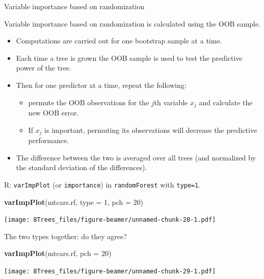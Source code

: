 \documentclass[10pt,ignorenonframetext,]{beamer}
\newenvironment{Shaded}{\begin{snugshade}}{\end{snugshade}}
\newcommand{\KeywordTok}[1]{\textcolor[rgb]{0.13,0.29,0.53}{\textbf{#1}}}
\newcommand{\DataTypeTok}[1]{\textcolor[rgb]{0.13,0.29,0.53}{#1}}
\newcommand{\DecValTok}[1]{\textcolor[rgb]{0.00,0.00,0.81}{#1}}
\newcommand{\NormalTok}[1]{#1}
\providecommand{\tightlist}{%
  \setlength{\itemsep}{0pt}\setlength{\parskip}{0pt}}
\begin{document}
\begin{frame}[fragile]

\begin{block}{Variable importance based on randomization}

Variable importance based on randomization is calculated using the OOB
sample.

\begin{itemize}
\tightlist
\item
  Computations are carried out for one bootstrap sample at a time.
\item
  Each time a tree is grown the OOB sample is used to test the
  predictive power of the tree.
\item
  Then for one predictor at a time, repeat the following:

  \begin{itemize}
  \tightlist
  \item
    permute the OOB observations for the \(j\)th variable \(x_j\) and
    calculate the new OOB error.
  \item
    If \(x_j\) is important, permuting its observations will decrease
    the predictive performance.
  \end{itemize}
\item
  The difference between the two is averaged over all trees (and
  normalized by the standard deviation of the differences).
\end{itemize}

R: \texttt{varImpPlot} (or \texttt{importance}) in \texttt{randomForest}
with \texttt{type=1}.

\end{block}

\end{frame}

\begin{frame}[fragile]

\begin{Shaded}
\begin{Highlighting}[]
\KeywordTok{varImpPlot}\NormalTok{(mtcars.rf, }\DataTypeTok{type =} \DecValTok{1}\NormalTok{, }\DataTypeTok{pch =} \DecValTok{20}\NormalTok{)}
\end{Highlighting}
\end{Shaded}

\texttt{[image: 8Trees\_files/figure-beamer/unnamed-chunk-28-1.pdf]}

\end{frame}

\begin{frame}[fragile]

The two types together: do they agree?

\begin{Shaded}
\begin{Highlighting}[]
\KeywordTok{varImpPlot}\NormalTok{(mtcars.rf, }\DataTypeTok{pch =} \DecValTok{20}\NormalTok{)}
\end{Highlighting}
\end{Shaded}

\texttt{[image: 8Trees\_files/figure-beamer/unnamed-chunk-29-1.pdf]}

\end{frame}
\end{document}
